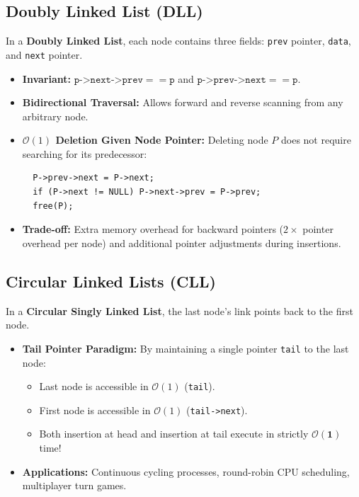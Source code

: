 \documentclass[12pt,a4paper]{article}
\begin{document}
\subsection{Doubly Linked List (DLL)}
In a \textbf{Doubly Linked List}, each node contains three fields: \texttt{prev} pointer, \texttt{data}, and \texttt{next} pointer.
\par\vspace{4pt}
\begin{itemize}[leftmargin=*, itemsep=3pt]
  \item \textbf{Invariant:} $\texttt{p->next->prev} == \texttt{p}$ and $\texttt{p->prev->next} == \texttt{p}$.
  \item \textbf{Bidirectional Traversal:} Allows forward and reverse scanning from any arbitrary node.
  \item \textbf{$\mathcal{O}(1)$ Deletion Given Node Pointer:} Deleting node $P$ does not require searching for its predecessor:
  \begin{verbatim}
  P->prev->next = P->next;
  if (P->next != NULL) P->next->prev = P->prev;
  free(P);
  \end{verbatim}
  \item \textbf{Trade-off:} Extra memory overhead for backward pointers ($2\times$ pointer overhead per node) and additional pointer adjustments during insertions.
\end{itemize}

\subsection{Circular Linked Lists (CLL)}
In a \textbf{Circular Singly Linked List}, the last node's link points back to the first node.
\par\vspace{3pt}
\begin{itemize}[leftmargin=*, itemsep=3pt]
  \item \textbf{Tail Pointer Paradigm:} By maintaining a single pointer \texttt{tail} to the last node:
  \begin{itemize}[leftmargin=*, nosep]
    \item Last node is accessible in $\mathcal{O}(1)$ (\texttt{tail}).
    \item First node is accessible in $\mathcal{O}(1)$ (\texttt{tail->next}).
    \item Both insertion at head and insertion at tail execute in strictly $\mathbf{\mathcal{O}(1)}$ time!
  \end{itemize}
  \item \textbf{Applications:} Continuous cycling processes, round-robin CPU scheduling, multiplayer turn games.
\end{itemize}
\end{document}
